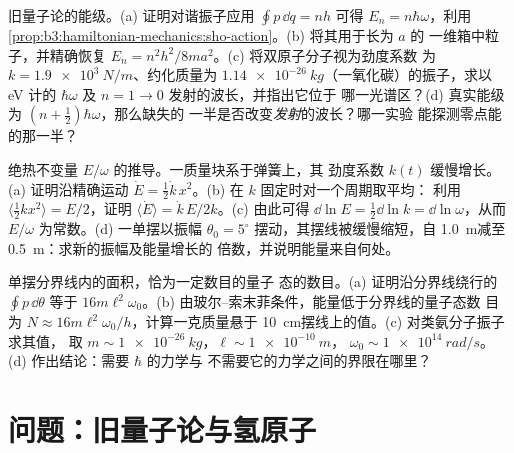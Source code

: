 \begin{exercise}[$\star\star\star$]\label{exo:b3:hamiltonian-mechanics:10}
旧量子论的能级。(a) 证明对谐振子应用 $\oint p\,\dd q = nh$
可得 $E_n = n\hbar\omega$，利用
\cref{prop:b3:hamiltonian-mechanics:sho-action}。(b) 将其用于长为 $a$ 的
一维箱中粒子，并精确恢复 $E_n =
n^2h^2/8ma^2$。(c) 将双原子分子视为劲度系数
为 $k = \qty{1.9e3}{N/m}$、约化质量为 $\qty{1.14e-26}
{kg}$（一氧化碳）的振子，求以 eV 计的 $\hbar\omega$ 及
$n = 1 \to 0$ 发射的波长，并指出它位于
哪一光谱区？(d) 真实能级为 $(n + \tfrac12)\hbar\omega$，那么缺失的
一半是否改变\emph{发射}的波长？哪一实验
能探测零点能的那一半？
\end{exercise}

\begin{exercise}[$\star\star\star$]\label{exo:b3:hamiltonian-mechanics:11}
绝热不变量 $E/\omega$ 的推导。一质量块系于弹簧上，其
劲度系数 $k(t)$ 缓慢增长。(a) 证明沿精确运动 $\dot E = \tfrac12\dot k\,
x^2$。(b) 在 $k$ 固定时对一个周期取平均：
利用 $\langle\tfrac12 kx^2\rangle = E/2$，证明 $\langle\dot E\rangle
= \dot k\,E/2k$。(c) 由此可得 $\dd\ln E = \tfrac12\dd\ln k = \dd\ln
\omega$，从而 $E/\omega$ 为常数。(d) 一单摆以振幅
$\theta_0 = 5^\circ$ 摆动，其摆线被缓慢缩短，自
\qty{1.0}{m}减至\qty{0.5}{m}：求新的振幅及能量增长的
倍数，并说明能量来自何处。
\end{exercise}

\begin{exercise}[$\star\star\star$]\label{exo:b3:hamiltonian-mechanics:12}
单摆分界线内的面积，恰为一定数目的量子
态的数目。(a) 证明沿分界线绕行的 $\oint p\,\dd\theta$ 等于
$16m\ell^2\omega_0$。(b) 由玻尔–索末菲条件，能量低于分界线的量子态数
目为 $N \approx
16m\ell^2\omega_0/h$，计算一克质量悬于
\qty{10}{cm}摆线上的值。(c) 对类氨分子振子求其值，
取 $m \sim \qty{1e-26}{kg}$，$\ell \sim \qty{1e-10}{m}$，
$\omega_0 \sim \qty{1e14}{rad/s}$。(d) 作出结论：需要 $\hbar$ 的力学与
不需要它的力学之间的界限在哪里？
\end{exercise}

\section{问题：旧量子论与氢原子}

